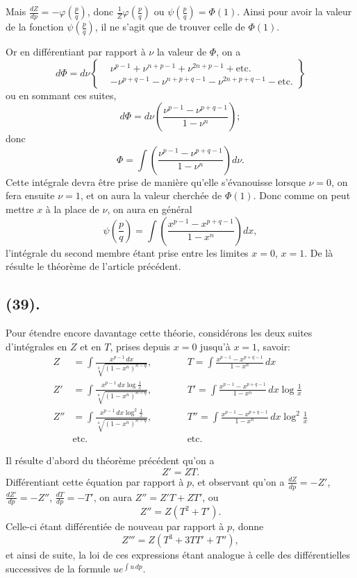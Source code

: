 \documentclass{article}
\begin{document}
Mais $\frac{dZ}{dp}=-\varphi\left(\frac{p}{q}\right)$, donc $\frac{1}{Z}\varphi\left(\frac{p}{q}\right)$ ou $\psi\left(\frac{p}{q}\right)=\Phi(1)$. Ainsi pour avoir la valeur de la fonction $\psi\left(\frac{p}{q}\right)$, il ne s'agit que de trouver celle de $\Phi(1)$.

Or en différentiant par rapport à $\nu$ la valeur de $\Phi$, on a
\[ d\Phi=d\nu\left\{\begin{aligned} &\nu^{p-1}+\nu^{n+p-1}+\nu^{2n+p-1}+\text{etc.}\\ &-\nu^{p+q-1}-\nu^{n+p+q-1}-\nu^{2n+p+q-1}-\text{etc.} \end{aligned}\right\} \]
ou en sommant ces suites,
\[ d\Phi=d\nu\left(\frac{\nu^{p-1}-\nu^{p+q-1}}{1-\nu^{n}}\right); \]
donc
\[ \Phi=\int\left(\frac{\nu^{p-1}-\nu^{p+q-1}}{1-\nu^{n}}\right)d\nu. \]
Cette intégrale devra être prise de manière qu'elle s'évanouisse lorsque $\nu=0$, on fera ensuite $\nu=1$, et on aura la valeur cherchée de $\Phi(1)$. Donc comme on peut mettre $x$ à la place de $\nu$, on aura en général
\[ \psi\left(\frac{p}{q}\right)=\int\left(\frac{x^{p-1}-x^{p+q-1}}{1-x^{n}}\right)dx, \]
l'intégrale du second membre étant prise entre les limites $x=0$, $x=1$. De là résulte le théorème de l'article précédent.

\subsection*{(39).}

Pour étendre encore davantage cette théorie, considérons les deux suites d'intégrales en $Z$ et en $T$, prises depuis $x=0$ jusqu'à $x=1$, savoir:
\[ \begin{aligned} Z&=\int\frac{x^{p-1}\,dx}{\sqrt[n]{(1-x^{n})^{n-q}}}, &\qquad& T=\int\frac{x^{p-1}-x^{p+q-1}}{1-x^{n}}\,dx\\ Z'&=\int\frac{x^{p-1}\,dx\log\frac{1}{x}}{\sqrt[n]{(1-x^{n})^{n-q}}}, && T'=\int\frac{x^{p-1}-x^{p+q-1}}{1-x^{n}}\,dx\log\frac{1}{x}\\ Z''&=\int\frac{x^{p-1}\,dx\log^{2}\frac{1}{x}}{\sqrt[n]{(1-x^{n})^{n-q}}}, && T''=\int\frac{x^{p-1}-x^{p+q-1}}{1-x^{n}}\,dx\log^{2}\frac{1}{x}\\ &\text{etc.} && \text{etc.} \end{aligned} \]

Il résulte d'abord du théorème précédent qu'on a
\[ Z'=ZT. \]
Différentiant cette équation par rapport à $p$, et observant qu'on a $\frac{dZ}{dp}=-Z'$, $\frac{dZ'}{dp}=-Z''$, $\frac{dT}{dp}=-T'$, on aura $Z''=Z'T+ZT'$, ou
\[ Z''=Z(T^{2}+T'). \]
Celle-ci étant différentiée de nouveau par rapport à $p$, donne
\[ Z'''=Z(T^{3}+3TT'+T''), \]
et ainsi de suite, la loi de ces expressions étant analogue à celle des différentielles successives de la formule $ue^{\displaystyle\int u\,dp}$.
\end{document}
